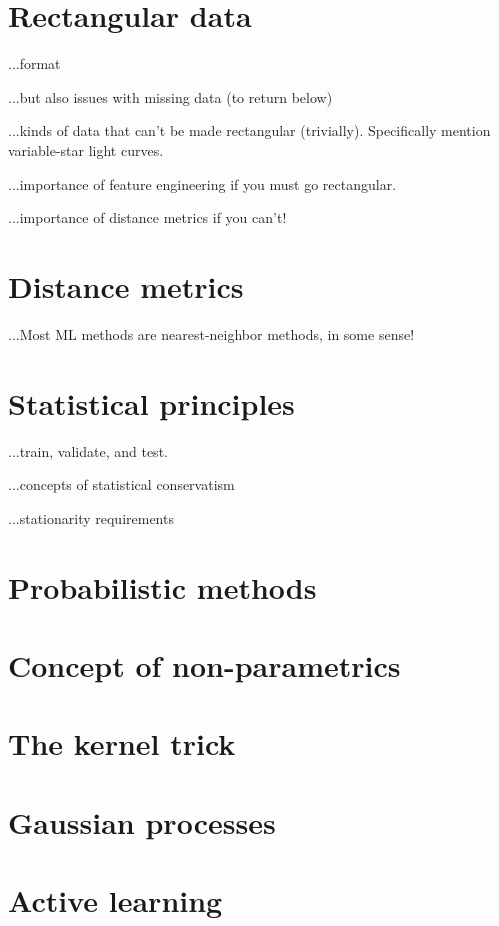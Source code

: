 \documentclass[12pt, letterpaper]{article}
\begin{document}
\section{Rectangular data}

...format

...but also issues with missing data (to return below)

...kinds of data that can't be made rectangular (trivially). Specifically mention variable-star light curves.

...importance of feature engineering if you must go rectangular.

...importance of distance metrics if you can't!

\section{Distance metrics}

...Most ML methods are nearest-neighbor methods, in some sense!

\section{Statistical principles}

...train, validate, and test.

...concepts of statistical conservatism

...stationarity requirements

\section{Probabilistic methods}

\section{Concept of non-parametrics}

\section{The kernel trick}

\section{Gaussian processes}

\section{Active learning}
\end{document}
